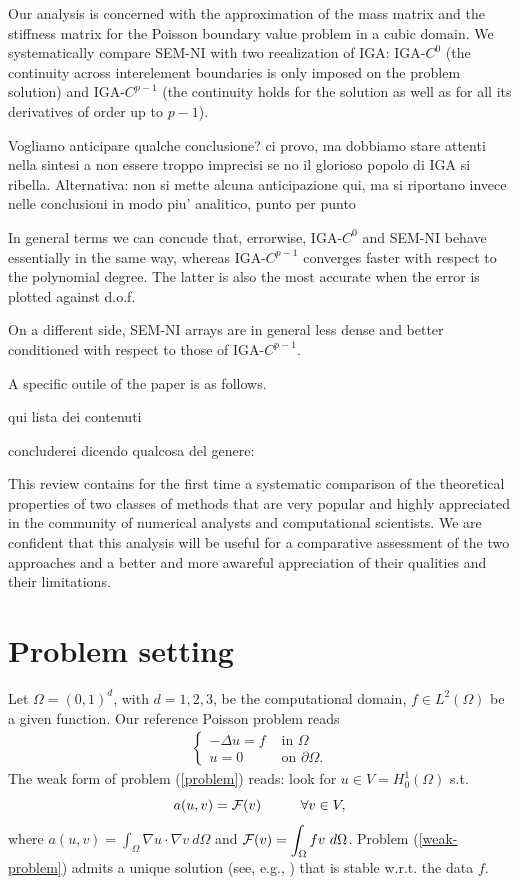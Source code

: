 \documentclass[11pt]{article}
\newcommand{\aq}{\color{blue}}
\begin{document}
Our analysis is concerned with the approximation of the mass matrix and 
the stiffness matrix for the Poisson boundary value problem in a cubic domain. 
We systematically compare SEM-NI with two reealization of IGA: IGA-$C^0$ 
(the continuity across interelement boundaries is only imposed on the 
problem solution) and IGA-$C^{p-1}$ (the continuity holds for the 
solution as well as for all its derivatives of order up to $p-1$).


{\aq Vogliamo anticipare qualche conclusione? ci provo, ma dobbiamo stare attenti nella sintesi a non essere troppo imprecisi se no il glorioso popolo di IGA si ribella. Alternativa: non si mette alcuna anticipazione qui, ma si riportano invece nelle conclusioni in modo piu' analitico, punto per punto}

In general terms we can concude that, errorwise, IGA-$C^0$ and SEM-NI 
behave essentially in the same way, whereas IGA-$C^{p-1}$ converges faster 
with respect to the {\aq polynomial degree}. The latter is also the most 
accurate when the error is plotted against d.o.f.

On a different side, SEM-NI arrays are in general less dense and better 
conditioned with respect to those of IGA-$C^{p-1}$.


A specific outile of the paper is as follows.

{\aq qui lista dei contenuti}


{\aq concluderei dicendo qualcosa del genere:}

This review contains for the first time a systematic comparison of the 
theoretical properties of two classes of methods that are very popular 
and highly appreciated in the community of numerical analysts and 
computational scientists. We are confident that this analysis will be 
useful for a comparative assessment of the two approaches and a better 
and more awareful appreciation of their qualities and their limitations. 

\section{Problem setting}
Let $\Omega=(0,1)^d$, with $d=1,2,3$, be the computational domain, 
$f\in L^2(\Omega)$ be a given  function. Our reference Poisson problem reads
\begin{eqnarray}\label{problem}
\left\{\begin{array}{ll}
-\Delta u=f & \mbox{ in }\Omega\\
u=0 & \mbox{ on }\partial\Omega.
\end{array}\right.
\end{eqnarray}
The weak form of problem (\ref{problem}) reads: look for $u\in V=H^1_0(\Omega)$
s.t. 
\begin{equation}\label{weak-problem}
a(u,v)={\cal F}(v)\hskip 1.cm 
\forall v\in V,
\end{equation}
where $\displaystyle a(u,v)=\int_\Omega \nabla u \cdot \nabla v\ d\Omega$ and 
$\displaystyle {\cal F}(v)=\int_\Omega f v\ d\Omega$. Problem 
(\ref{weak-problem}) admits a unique solution (see, e.g., \cite{qvb})
that is stable w.r.t. the data $f$.
\end{document}
